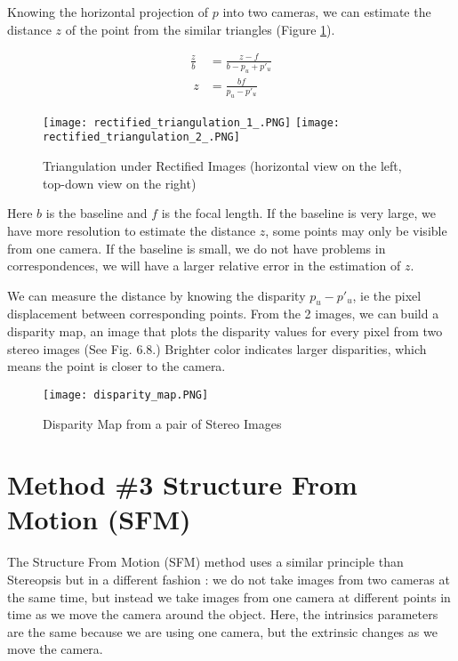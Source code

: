 \documentclass[twoside]{article}
\begin{document}
Knowing the horizontal projection of $p$ into two cameras, we can estimate the distance $z$ of the point from the similar triangles (Figure \ref{recttri}).

\begin{align}
  \frac{z}{b} &= \frac{z-f}{b-p_u+p'_u} \\
  \ z &= \frac{bf}{p_u-p'_u}
\end{align}

\begin{figure}[h!]
  \begin{center}
	\texttt{[image: rectified\_triangulation\_1\_.PNG]}
	\texttt{[image: rectified\_triangulation\_2\_.PNG]}  \end{center}
  \caption{Triangulation under Rectified Images (horizontal view on the left, top-down view on the right)}
  \label{recttri}
\end{figure}

Here $b$ is the baseline and $f$ is the focal length. If the baseline is very large, we have more resolution to estimate the distance $z$, some points may only be visible from one camera. If the baseline is small, we do not have problems in correspondences, we will have a larger relative error in the estimation of $z$.

We can measure the distance by knowing the disparity $p_u-p'_u$, ie the pixel displacement between corresponding points. From the 2 images, we can build a disparity map, an image that plots the disparity values for every pixel from two stereo images (See Fig. 6.8.) Brighter color indicates larger disparities, which means the point is closer to the camera.

\begin{figure}[h!]
  \begin{center}
	\texttt{[image: disparity\_map.PNG]}  \end{center}
  \caption{Disparity Map from a pair of Stereo Images}
  \label{ex}
\end{figure}

\newpage
\section{Method \#3 Structure From Motion (SFM)}

The Structure From Motion (SFM) method uses a similar principle than Stereopsis but in a different fashion : we do not take images from two cameras at the same time, but instead we take images from one camera at different points in time as we move the camera around the object. Here, the intrinsics parameters are the same because we are using one camera, but the extrinsic changes as we move the camera.
\end{document}

